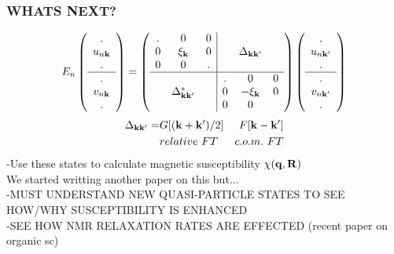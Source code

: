 \documentclass{beamer}
\newcommand\vk{\bold{k}}
\newcommand\vq{\bold{q}}
\begin{document}
\begin{frame} \frametitle{WHATS NEXT?}
\begin{eqnarray}
E_n\left( \begin{array}{cc}
. \\
u_{n\vk}  \\ 
. \\ \hline
. \\
v_{n\vk} \\
. \\ 
\end{array} \right)
=\left( \begin{array}{ccc|ccc}
. & 0 & 0 &  &  &  \\
0 & \xi_\vk & 0 & & \Delta_{\vk\vk'} & \\
0 & 0 & . &  &  &  \\ \hline
 &  &  & . & 0 & 0 \\
 & \Delta^*_{\vk\vk'} & & 0 & -\xi_\vk & 0  \\
 &  &  & 0 & 0 &  \\  \end{array} \right)
 \left( \begin{array}{cc}
. \\
u_{n\vk'}  \\ 
. \\ \hline
. \\
v_{n\vk'} \\
. \\ 
\end{array} \right)
\end{eqnarray}
\begin{eqnarray}
\Delta_{\vk\vk'} = &G[(\vk+\vk')/2] & F[\vk-\vk'] \\
   & relative\,\, FT & c.o.m.\,\, FT \\
\end{eqnarray}
-Use these states to calculate magnetic susceptibility  $\chi(\vq,\bold{R})$ \\
We started writting another paper on this but... \\
-MUST UNDERSTAND NEW QUASI-PARTICLE STATES TO SEE HOW/WHY SUSCEPTIBILITY IS ENHANCED \\
-SEE HOW NMR RELAXATION RATES ARE EFFECTED (recent paper on organic sc)
\end{frame}
\end{document}
